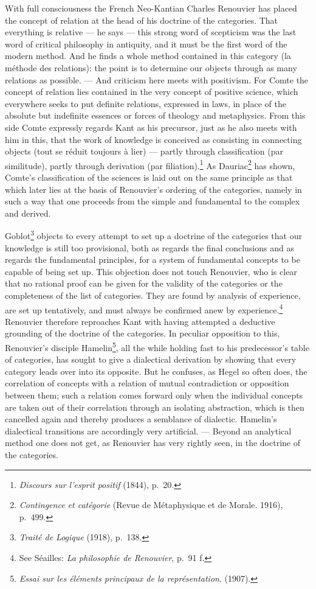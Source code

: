 \documentclass[12pt]{article}
\newcommand{\opage}[1]{\marginnote{\footnotesize\textit{[#1]}}}
\begin{document}
With full consciousness the French Neo-Kantian Charles Renouvier has placed
the concept of relation at the head of \opage{13}his doctrine of the categories. That
everything is relative --- he says --- this strong word of scepticism was
the last word of critical philosophy in antiquity, and it must be the first
word of the modern method. And he finds a whole method contained in this
category (la méthode des relations): the point is to determine our objects
through as many relations as possible. --- And criticism here meets with
positivism. For Comte the concept of relation lies contained in the very
concept of positive science, which everywhere seeks to put definite
relations, expressed in laws, in place of the absolute but indefinite
essences or forces of theology and metaphysics. From this side Comte
expressly regards Kant as his precursor, just as he also meets with him in
this, that the work of knowledge is conceived as consisting in connecting
objects (tout se réduit toujours à lier) --- partly through classification
(par similitude), partly through derivation (par
filiation).\footnote{\textit{Discours sur l'esprit positif} (1844), p.~20.}
As Dauriac\footnote{\textit{Contingence et catégorie} (Revue de Métaphysique
et de Morale. 1916), p.~499.} has shown, Comte's classification of the
sciences is laid out on the same principle as that which later lies at the
basis of Renouvier's ordering of the categories, namely in such a way that
one proceeds from the simple and fundamental to the complex and derived.

Goblot\footnote{\textit{Traité de Logique} (1918), p.~138.} objects to every
attempt to set up a doctrine of the categories that our knowledge is still
too provisional, both as regards the final conclusions and as regards the
fundamental principles, for a system of fundamental concepts to be capable
of being set up. This objection does not touch Renouvier, who is clear that
no rational proof can be given for the validity of the categories or the
\opage{14}completeness of the list of categories. They are found by analysis of
experience, are set up tentatively, and must always be confirmed anew by
experience.\footnote{See Séailles: \textit{La philosophie de Renouvier},
p.~91 f.} Renouvier therefore reproaches Kant with having attempted a
deductive grounding of the doctrine of the categories. In peculiar
opposition to this, Renouvier's disciple Hamelin\footnote{\textit{Essai sur
les éléments principaux de la représentation}. (1907).}, all the while
holding fast to his predecessor's table of categories, has sought to give a
dialectical derivation by showing that every category leads over into its
opposite. But he confuses, as Hegel so often does, the correlation of
concepts with a relation of mutual contradiction or opposition between them;
such a relation comes forward only when the individual concepts are taken
out of their correlation through an isolating abstraction, which is then
cancelled again and thereby produces a semblance of dialectic. Hamelin's
dialectical transitions are accordingly very artificial. --- Beyond an
analytical method one does not get, as Renouvier has very rightly seen, in
the doctrine of the categories.
\end{document}
